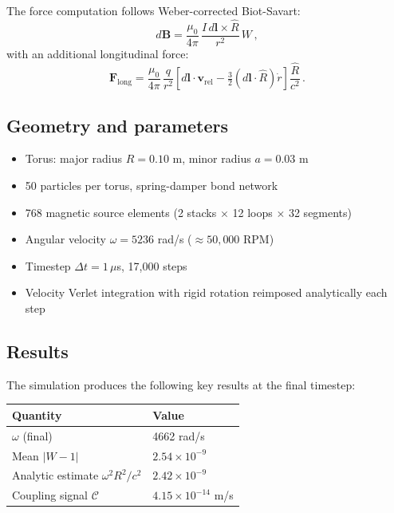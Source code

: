 \documentclass[12pt,preprint,amsmath,amssymb]{revtex4-2}
\begin{document}
The force computation follows Weber-corrected Biot-Savart:
\begin{equation}
d\mathbf{B} = \frac{\mu_0}{4\pi}\,\frac{I\,d\mathbf{l} \times \hat{R}}{r^2}\,W\,,
\end{equation}
with an additional longitudinal force:
\begin{equation}
\mathbf{F}_{\text{long}} = \frac{\mu_0}{4\pi}\,\frac{q}{r^2}
\left[d\mathbf{l}\cdot\mathbf{v}_{\text{rel}} - \tfrac{3}{2}(d\mathbf{l}\cdot\hat{R})\dot{r}\right]
\frac{\hat{R}}{c^2}\,.
\end{equation}

\subsection{Geometry and parameters}

\begin{itemize}
\item Torus: major radius $R = 0.10$ m, minor radius $a = 0.03$ m
\item 50 particles per torus, spring-damper bond network
\item 768 magnetic source elements (2 stacks $\times$ 12 loops $\times$ 32 segments)
\item Angular velocity $\omega = 5236$ rad/s ($\approx 50{,}000$ RPM)
\item Timestep $\Delta t = 1\,\mu$s, 17{,}000 steps
\item Velocity Verlet integration with rigid rotation reimposed analytically each step
\end{itemize}

\subsection{Results}

The simulation produces the following key results at the final timestep:

\begin{table}[h]
\centering
\begin{tabular}{@{}ll@{}}
\toprule
Quantity & Value \\
\midrule
$\omega$ (final) & 4662 rad/s \\
Mean $|W - 1|$ & $2.54 \times 10^{-9}$ \\
Analytic estimate $\omega^2 R^2/c^2$ & $2.42 \times 10^{-9}$ \\
Coupling signal $\mathcal{C}$ & $4.15 \times 10^{-14}$ m/s \\
\bottomrule
\end{tabular}
\end{table}
\end{document}
